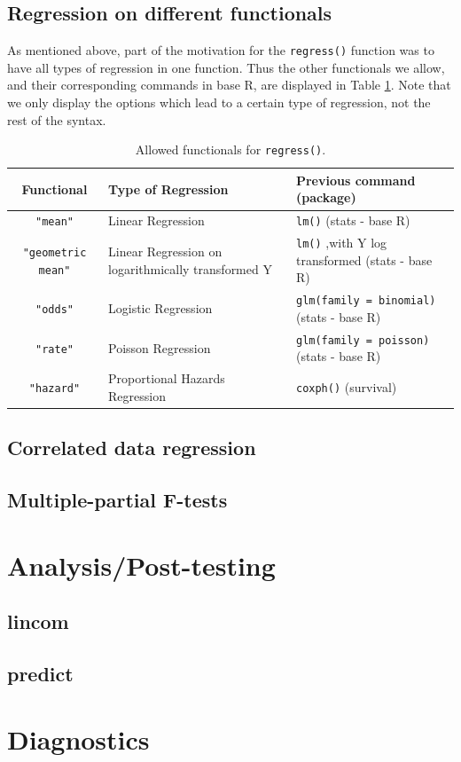 \documentclass[landscape]{article}
\begin{document}
\subsection{Regression on different functionals}
As mentioned above, part of the motivation for the \texttt{regress()} function was to have all types of regression in one function. Thus the other functionals we allow, and their corresponding commands in base R, are displayed in Table \ref{fnctl}. Note that we only display the options which lead to a certain type of regression, not the rest of the syntax.

\begin{table}[ht]
\centering
\begin{tabular}{c|l|l}
Functional & Type of Regression & Previous command (package)\\
\hline
\texttt{"mean"} & Linear Regression & \texttt{lm()} (stats - base R)\\
\texttt{"geometric mean"} & Linear Regression on logarithmically transformed Y & \texttt{lm()} ,with Y log transformed (stats - base R)\\
\texttt{"odds"} & Logistic Regression & \texttt{glm(family = binomial)} (stats - base R)\\
\texttt{"rate"} & Poisson Regression & \texttt{glm(family = poisson)} (stats - base R)\\
\texttt{"hazard"} & Proportional Hazards Regression & \texttt{coxph()} (survival)
\end{tabular}
\caption{Allowed functionals for \texttt{regress()}.}
\label{fnctl}
\end{table}
\FloatBarrier

\subsection{Correlated data regression}

\subsection{Multiple-partial F-tests}


\section{Analysis/Post-testing}

\subsection{lincom}

\subsection{predict}
\section{Diagnostics}
\end{document}
